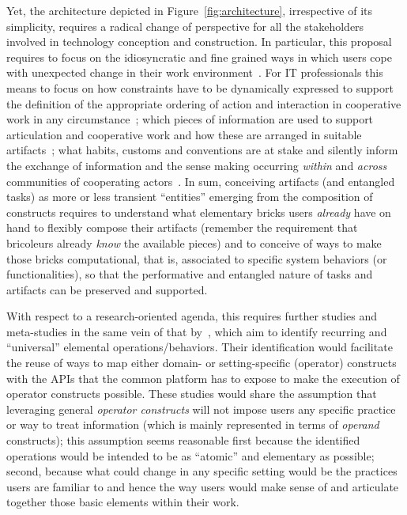 \documentclass{article}
\begin{document}
Yet, the architecture depicted in Figure~\ref{fig:architecture}, irrespective of its simplicity, requires a radical change of perspective for all the stakeholders involved in technology conception and construction. In particular, this proposal requires to focus on the idiosyncratic and fine grained ways in which users cope with unexpected change in their work environment~\citep{bannon_human_1992}. For IT professionals this means to focus on how constraints have to be dynamically expressed to support the definition of the appropriate ordering of action and interaction in cooperative work in any circumstance~\citep[e.g. ][]{pesic_constraint-based_2007,van_der_aalst_declarative_2009}; which pieces of information are used to support articulation and cooperative work and how these are arranged in suitable artifacts~\citep[e.g. ][]{nemeth_master_2003,cabitza_remain_2011}; what habits, customs and conventions are at stake and silently inform the exchange of information and the sense making occurring \emph{within} and \emph{across} communities of cooperating actors~\citep{mark_conventions_2002,cabitza_leveraging_2009}. In sum, conceiving artifacts (and entangled tasks) as more or less transient ``entities'' emerging from the composition of constructs requires to understand what elementary bricks users \emph{already} have on hand to flexibly compose their artifacts (remember the requirement that bricoleurs already \emph{know} the available pieces) and to conceive of ways to make those bricks computational, that is, associated to specific system behaviors (or functionalities), so that the performative and entangled nature of tasks and artifacts can be preserved and supported.


With respect to a research-oriented agenda, this requires further studies and meta-studies in the same vein of that by~\citet{martin_patterns_2004,cabitza_remain_2011}, which aim to identify recurring and ``universal'' elemental operations/behaviors. Their identification would facilitate the reuse of ways to map either domain- or setting-specific (operator) constructs with the APIs that the common platform has to expose to make the execution of operator constructs possible.
These studies would share the assumption that leveraging general \emph{operator constructs} will not impose users any specific practice or way to treat information (which is mainly represented in terms of \emph{operand} constructs); this assumption seems reasonable first because the identified operations would be intended to be as ``atomic'' and elementary as possible; second, because what could change in any specific setting would be the practices users are familiar to and hence the way users would make sense of and articulate together those basic elements within their work. 
\end{document}
